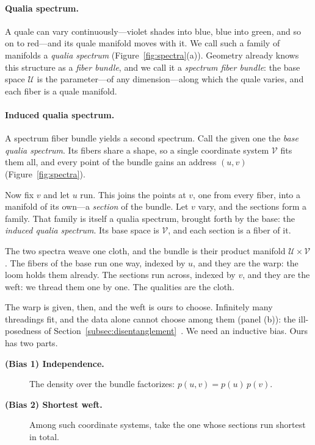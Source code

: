 \paragraph{Qualia spectrum.}
A quale can vary continuously---violet shades into blue, blue into green, and so
on to red---and its quale manifold moves with it. We call such a family of
manifolds a \textit{qualia spectrum} (Figure~\ref{fig:spectra}(a)). Geometry
already knows this structure as a \textit{fiber bundle}, and we call it a
\textit{spectrum fiber bundle}: the base space $\mathcal{U}$ is the
parameter---of any dimension---along which the quale varies, and each fiber is a
quale manifold.

\paragraph{Induced qualia spectrum.}
A spectrum fiber bundle yields a second spectrum. Call the given one the
\textit{base qualia spectrum}. Its fibers share a shape, so a single
coordinate system $\mathcal{V}$ fits them all, and every point of the bundle
gains an address $(u, v)$ (Figure~\ref{fig:spectra}).

Now fix $v$ and let $u$ run. This joins the points at $v$, one from every
fiber, into a manifold of its own---a \textit{section} of the bundle. Let $v$
vary, and the sections form a family. That family is itself a qualia
spectrum, brought forth by the base: the \textit{induced qualia spectrum}.
Its base space is $\mathcal{V}$, and each section is a fiber of it.

The two spectra weave one cloth, and the bundle is their product manifold
$\mathcal{U} \times \mathcal{V}$. The fibers of the base run one way, indexed
by $u$, and they are the warp: the loom holds them already. The sections run
across, indexed by $v$, and they are the weft: we thread them one by one. The
qualities are the cloth.

The warp is given, then, and the weft is ours to choose. Infinitely many
threadings fit, and the data alone cannot choose among them (panel (b)): the
ill-posedness of Section~\ref{subsec:disentanglement}~\citep{Locatello20197247}.
We need an inductive bias. Ours has two parts.

\begin{description}
    \item[\textbf{(Bias 1) Independence.}] The density over the bundle
          factorizes: $p(u, v) = p(u)\,p(v)$.
    \item[\textbf{(Bias 2) Shortest weft.}] Among such coordinate systems,
          take the one whose sections run shortest in total.
\end{description}

